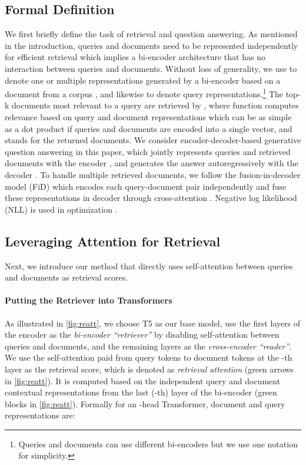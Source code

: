 \documentclass[11pt, dvipsnames]{article}
\begin{document}
\subsection{Formal Definition}\label{sec:reatt_definition}
We first briefly define the task of retrieval and question answering.
As mentioned in the introduction, queries and documents need to be represented independently for efficient retrieval which implies a bi-encoder architecture that has no interaction between queries and documents.
Without loss of generality, we use  to denote one or multiple representations generated by a bi-encoder based on a document from a corpus , and likewise  to denote query representations.\footnote{Queries and documents can use different bi-encoders but we use one notation for simplicity.}
The top-k documents most relevant to a query are retrieved by , where function  computes relevance based on query and document representations which can be as simple as a dot product if queries and documents are encoded into a single vector, and  stands for the returned documents.
We consider encoder-decoder-based generative question answering in this paper, which jointly represents queries and retrieved documents with the encoder , and generates the answer  autoregressively with the decoder .
To handle multiple retrieved documents, we follow the fusion-in-decoder model (FiD) \cite{fid-2021-izacard} which encodes each query-document pair independently and fuse these representations in decoder through cross-attention .
Negative log likelihood (NLL) is used in optimization .

\subsection{Leveraging Attention for Retrieval}\label{sec:reatt_intro}
Next, we introduce our method that directly uses self-attention between queries and documents as retrieval scores.

\paragraph{Putting the Retriever into Transformers}
As illustrated in \autoref{fig:reatt}, we choose T5 \cite{t5-2020-raffel} as our base model, use the first  layers of the encoder as the \emph{bi-encoder ``retriever''} by disabling self-attention between queries and documents, and the remaining  layers as the \emph{cross-encoder ``reader''}.
We use the self-attention paid from query tokens to document tokens at the -th layer as the retrieval score, which is denoted as \emph{retrieval attention} (green arrows in \autoref{fig:reatt}).
It is computed based on the independent query and document contextual representations from the last (-th) layer of the bi-encoder (green blocks in \autoref{fig:reatt}).
Formally for an -head Transformer, document and query representations are:
\end{document}

